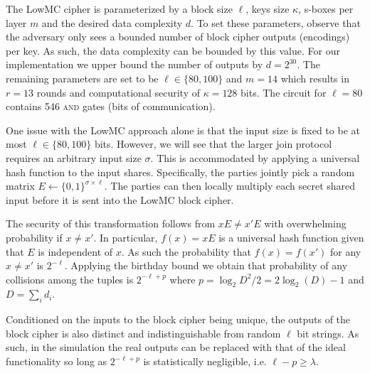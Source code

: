 The LowMC cipher is parameterized by a block size $\ell$, keys size $\kappa$, s-boxes per layer $m$ and the desired data complexity $d$. To set these parameters, observe that the adversary only sees a bounded number of block cipher outputs (encodings) per key. As such, the data complexity can be bounded by this value. For our implementation we upper bound the number of outputs by $d= 2^{30}$. The remaining parameters are set to be $\ell\in\{80, 100\}$ and $m=14$ which results in $r=13$ rounds and computational security of $\kappa=128$ bits\cite{lowmc}. The circuit for $\ell=80$ contains 546 \textsc{and} gates (bits of communication).

%


One issue with the LowMC approach alone is that the input size is fixed to be at most $\ell\in\{80,100\}$ bits. However, we will see that the larger join protocol requires an arbitrary input size $\sigma$. This is accommodated by applying a universal hash function to the input shares. Specifically, the parties jointly pick a random matrix $E\gets\{0,1\}^{\sigma\times \ell}$. The parties can then locally multiply each secret shared input before it is sent into the LowMC block cipher.

The security of this transformation follows from $xE\neq x'E$ with overwhelming probability if $x\neq x'$. In particular, $f(x)=xE$ is a universal hash function given that $E$ is independent of $x$. As such the probability that $f(x)=f(x')$ for any $x\neq x'$  is $2^{-\ell}$. Applying the birthday bound we obtain that probability of any collisions among the tuples is $2^{-\ell+p}$ where $p=\log_2 D^2/2=2\log_2(D)-1$ and $D=\sum_i d_i$.

Conditioned on the inputs to the block cipher being unique, the outputs of the block cipher is also distinct and indistinguishable from random $\ell$ bit strings. As such, in the simulation the real outputs can be replaced with that of the ideal functionality so long as $2^{-\ell+p}$ is statistically negligible, i.e. $\ell-p\geq\lambda$.



%

